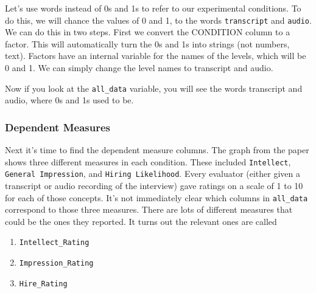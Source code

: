 \documentclass[
]{book}
\newenvironment{Shaded}{\begin{snugshade}}{\end{snugshade}}
\newcommand{\FunctionTok}[1]{\textcolor[rgb]{0.00,0.00,0.00}{#1}}
\newcommand{\NormalTok}[1]{#1}
\newcommand{\OtherTok}[1]{\textcolor[rgb]{0.56,0.35,0.01}{#1}}
\newcommand{\SpecialCharTok}[1]{\textcolor[rgb]{0.00,0.00,0.00}{#1}}
\newcommand{\StringTok}[1]{\textcolor[rgb]{0.31,0.60,0.02}{#1}}
\providecommand{\tightlist}{%
  \setlength{\itemsep}{0pt}\setlength{\parskip}{0pt}}
\begin{document}
Let's use words instead of 0s and 1s to refer to our experimental conditions. To do this, we will chance the values of 0 and 1, to the words \texttt{transcript} and \texttt{audio}. We can do this in two steps. First we convert the CONDITION column to a factor. This will automatically turn the 0s and 1s into strings (not numbers, text). Factors have an internal variable for the names of the levels, which will be 0 and 1. We can simply change the level names to transcript and audio.

\begin{Shaded}
\end{Shaded}

Now if you look at the \texttt{all\_data} variable, you will see the words transcript and audio, where 0s and 1s used to be.

\hypertarget{dependent-measures}{%
\subsubsection{Dependent Measures}\label{dependent-measures}}

Next it's time to find the dependent measure columns. The graph from the paper shows three different measures in each condition. These included \texttt{Intellect}, \texttt{General\ Impression}, and \texttt{Hiring\ Likelihood}. Every evaluator (either given a transcript or audio recording of the interview) gave ratings on a scale of 1 to 10 for each of those concepts. It's not immediately clear which columns in \texttt{all\_data} correspond to those three measures. There are lots of different measures that could be the ones they reported. It turns out the relevant ones are called

\begin{enumerate}
\def\labelenumi{\arabic{enumi}.}
\tightlist
\item
  \texttt{Intellect\_Rating}
\item
  \texttt{Impression\_Rating}
\item
  \texttt{Hire\_Rating}
\end{enumerate}
\end{document}
